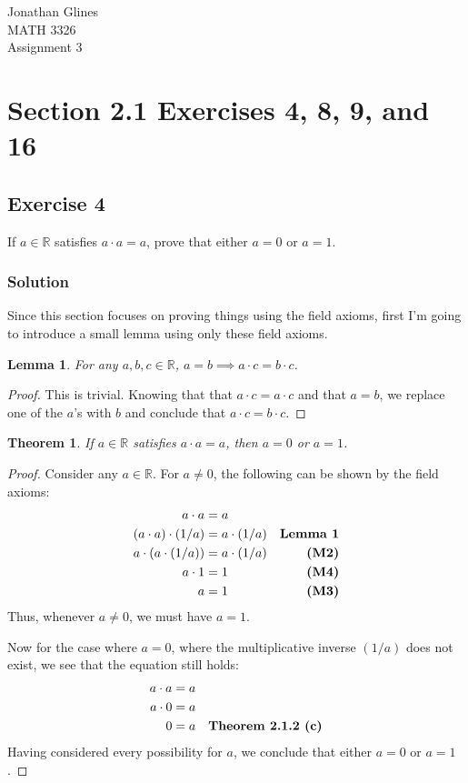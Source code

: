 \documentclass[12pt]{article}
\newtheorem*{thm}{Theorem}
\newtheorem{lem}{Lemma}
\begin{document}
\begin{flushright}
{\Large
Jonathan Glines \\
MATH 3326 \\
Assignment 3 \\
}
\end{flushright}
\section*{Section 2.1 Exercises 4, 8, 9, and 16}
\subsection*{Exercise 4}
If $a \in \mathbb{R}$ satisfies $a \cdot a = a$, prove that either $a = 0$ or $a = 1$.
\subsubsection*{Solution}
Since this section focuses on proving things using the field axioms, first I'm going to introduce a small lemma using only these field axioms.
\begin{lem}
For any $a, b, c \in \mathbb{R}$, $a = b \implies a \cdot c = b \cdot c$.
\end{lem}
\begin{proof}
This is trivial. Knowing that that $a \cdot c = a \cdot c$ and that $a = b$, we replace one of the $a$'s with $b$ and conclude that $a \cdot c = b \cdot c$.
\end{proof}

\begin{thm}
If $a \in \mathbb{R}$ satisfies $a \cdot a = a$, then $a = 0$ or $a = 1$.
\end{thm}
\begin{proof}
Consider any $a \in \mathbb{R}$. For $a \neq 0$, the following can be shown by the field axioms:
\begin{align*}
a \cdot a &= a \\
\left(a \cdot a\right) \cdot \left(1/a\right) &= a \cdot \left(1 / a\right) & \text{\bf Lemma 1}\\
a \cdot \left(a \cdot \left(1/a\right)\right) &= a \cdot \left(1/a\right) & \text{\bf (M2)} \\
a \cdot 1 &= 1 & \text{\bf (M4)}\\
a &= 1 & \text{\bf (M3)}
\end{align*}
Thus, whenever $a \neq 0$, we must have $a = 1$.

Now for the case where $a = 0$, where the multiplicative inverse $\left(1/a\right)$ does not exist, we see that the equation still holds:
\begin{align*}
a \cdot a &= a \\
a \cdot 0 &= a \\
0 &= a & \text{\bf Theorem 2.1.2 (c)}
\end{align*}
Having considered every possibility for $a$, we conclude that either $a = 0$ or $a = 1$.
\end{proof}
\end{document}
